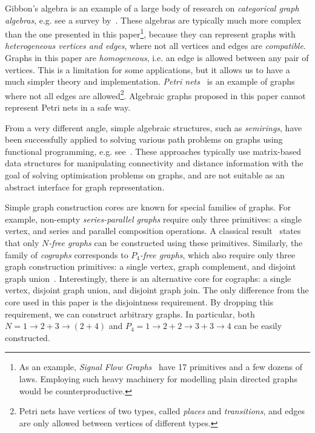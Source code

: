 Gibbon's algebra is an example of a large body of research on \emph{categorical
graph algebras}, e.g. see a survey by~\citet{2010_selinger_survey}. These algebras
are typically much more complex than the one presented in this paper\footnote{As an
example, \emph{Signal Flow Graphs}~\cite{2015_bonchi_sfg} have 17 primitives
and a few dozens of laws. Employing such heavy machinery for modelling plain directed
graphs would be counterproductive.},
because they can represent graphs with
\emph{heterogeneous vertices and edges}, where not all vertices
and edges are \emph{compatible}. Graphs in this paper are \emph{homogeneous}, i.e.
an edge is allowed between any pair of vertices. This is a limitation for some
applications, but it allows us to have a much simpler theory and implementation.
\emph{Petri nets}~\cite{1989_murata_pn} is an example of graphs where not all
edges are allowed\footnote{Petri nets have vertices of two types, called \emph{places}
and \emph{transitions}, and edges are only allowed between vertices of different
types.}.
Algebraic graphs proposed in this paper cannot represent Petri
nets in a safe way.

From a very different angle, simple algebraic structures, such as \emph{semirings},
have been successfully applied to solving various path problems on graphs using
functional programming, e.g. see~\citet{2013_semirings_dolan}. These approaches
typically use matrix-based data structures for manipulating connectivity and distance
information with the goal of solving optimisation problems on graphs, and are not
suitable as an abstract interface for graph representation.

Simple graph construction cores are known for special families of graphs. For example,
non-empty \emph{series-parallel graphs} require only three primitives: a single vertex,
and series and parallel composition operations. A classical result~\cite{1979_valdes_sp}
states that only \emph{$N$-free graphs} can be constructed using these primitives.
Similarly, the family of \emph{cographs} corresponds to \emph{$P_4$-free graphs}, which
also require only three graph construction primitives: a single vertex, graph complement,
and disjoint graph union~\cite{1981_corneil_cographs}. Interestingly, there is an
alternative core for cographs: a single vertex, disjoint graph union, and disjoint graph
join. The only difference from the core used in this paper is the disjointness requirement.
By dropping this requirement, we can construct arbitrary graphs. In particular, both
$N = 1 \rightarrow 2 + 3 \rightarrow (2 + 4)$ and
$P_4 = 1 \rightarrow 2 + 2 \rightarrow 3 + 3 \rightarrow 4$ can be easily constructed.

